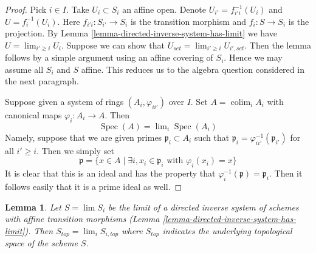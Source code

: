 \documentclass{stacks-project}
\newenvironment{reference}{\comment}{\endcomment}
\theoremstyle{plain}
\newtheorem{lemma}[subsection]{Lemma}
\theoremstyle{definition}
\theoremstyle{remark}
\numberwithin{equation}{subsection}
\def\lim{\mathop{\mathrm{lim}}\nolimits}
\def\colim{\mathop{\mathrm{colim}}\nolimits}
\def\Spec{\mathop{\mathrm{Spec}}}
\begin{document}
\begin{proof}
Pick $i \in I$. Take $U_i \subset S_i$ an affine open.
Denote $U_{i'} = f_{i'i}^{-1}(U_i)$ and $U = f_i^{-1}(U_i)$.
Here $f_{i'i} : S_{i'} \to S_i$ is the transition morphism
and $f_i : S \to S_i$ is the projection.
By Lemma \ref{lemma-directed-inverse-system-has-limit}
we have $U = \lim_{i' \geq i} U_i$.
Suppose we can show that $U_{set} = \lim_{i' \geq i} U_{i', set}$. Then
the lemma follows by a simple argument using an affine covering of $S_i$.
Hence we may assume all $S_i$ and $S$ affine. This reduces us to the
algebra question considered in the next paragraph.

\medskip\noindent
Suppose given a system of rings $(A_i, \varphi_{ii'})$
over $I$. Set $A = \colim_i A_i$ with canonical maps $\varphi_i : A_i \to A$.
Then
$$
\Spec(A) = \lim_i \Spec(A_i)
$$
Namely, suppose that we are given primes $\mathfrak p_i \subset A_i$
such that $\mathfrak p_i = \varphi_{ii'}^{-1}(\mathfrak p_{i'})$
for all $i' \geq i$. Then we simply set
$$
\mathfrak p =
\{x \in A
\mid
\exists i, x_i \in \mathfrak p_i \text{ with }\varphi_i(x_i) = x\}
$$
It is clear that this is an ideal and has the property that
$\varphi_i^{-1}(\mathfrak p) = \mathfrak p_i$. Then it follows
easily that it is a prime ideal as well.
\end{proof}

\begin{lemma}
\label{lemma-inverse-limit-top}
\begin{reference}
\cite[IV, Proposition 8.2.9]{EGA}
\end{reference}
Let $S = \lim S_i$ be the limit of a directed inverse system
of schemes with affine transition morphisms
(Lemma \ref{lemma-directed-inverse-system-has-limit}). Then
$S_{top} = \lim_i S_{i, top}$ where $S_{top}$
indicates the underlying topological space of the scheme $S$.
\end{lemma}
\end{document}
